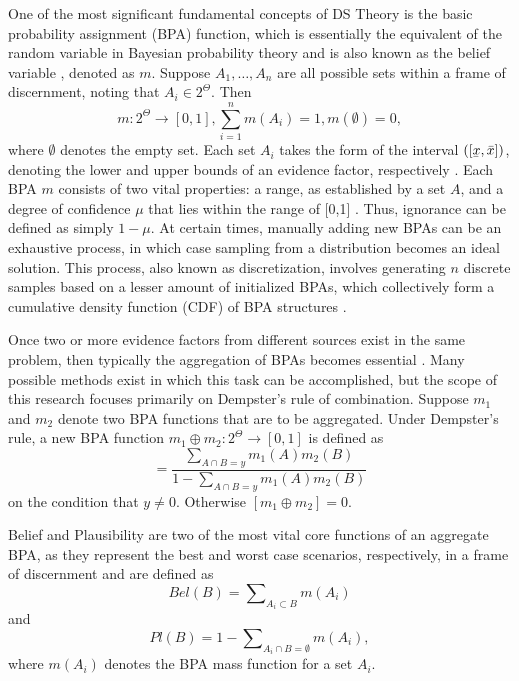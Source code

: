 \documentclass[12pt]{uthesis-v12}  %
\newcommand{\ubar}[1]{\underaccent{\bar}{#1}}
\begin{document}
One of the most significant fundamental concepts of DS Theory is the basic probability assignment (BPA) function, which is essentially the equivalent of the random variable in Bayesian probability theory and is also known as the belief variable \cite{auer}, denoted as $m$. Suppose $A_1,\dots,A_n$ are all possible sets within a frame of discernment, noting that $A_i \in 2^\Theta$. Then
\begin{equation}
m: 2^\Theta \rightarrow [0,1], \sum\limits_{i=1}^n m(A_i) = 1, m(\emptyset) = 0,
\label{init}
\end{equation}
\noindent where $\emptyset$ denotes the empty set. Each set $A_i$ takes the form of the interval $([\ubar{x},\bar{x}])$, denoting the lower and upper bounds of an evidence factor, respectively \cite{auer}. Each BPA $m$ consists of two vital properties: a range, as established by a set $A$, and a degree of confidence $\mu$ that lies within the range of [0,1] \cite{ipp}. Thus, ignorance can be defined as simply $1 - \mu$. At certain times, manually adding new BPAs can be an exhaustive process, in which case sampling from a distribution becomes an ideal solution. This process, also known as discretization, involves generating $n$ discrete samples based on a lesser amount of initialized BPAs, which collectively form a cumulative density function (CDF) of BPA structures \cite{tonon}.

Once two or more evidence factors from different sources exist in the same problem, then typically the aggregation of BPAs becomes essential \cite{auer}. Many possible methods exist in which this task can be accomplished, but the scope of this research focuses primarily on Dempster's rule of combination. Suppose $m_1$ and $m_2$ denote two BPA functions that are to be aggregated. Under Dempster's rule, a new BPA function $m_1 \oplus m_2 : 2^\Theta \rightarrow [0,1]$ is defined as \cite{alani}
\begin{equation}
[m_1 \oplus m_2] = \frac{\sum\nolimits_{A\cap B = y} m_1(A)m_2(B)}{1-\sum\nolimits_{A\cap B = y} m_1(A)m_2(B)}
\label{agg}
\end{equation}
\noindent on the condition that $y \neq 0$. Otherwise $[m_1 \oplus m_2] = 0$. 

Belief and Plausibility are two of the most vital core functions of an aggregate BPA, as they represent the best and worst case scenarios, respectively, in a frame of discernment and are defined as
\begin{equation}
Bel(B) = \sum\nolimits_{A_i \subset B} m(A_i)
\label{bel}
\end{equation}
and
\begin{equation}
Pl(B) = 1 - \sum\nolimits_{A_i \cap B = \emptyset} m(A_i),
\label{pl}
\end{equation}
\noindent where $m(A_i)$ denotes the BPA mass function for a set $A_i$.
\end{document}
